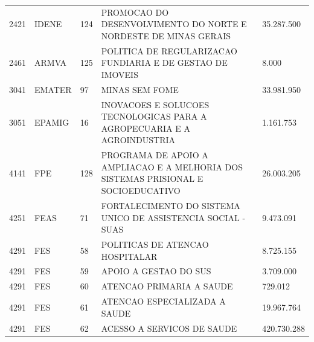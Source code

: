 \documentclass{article}
\begin{document}
\begin{longtable}[c]{m{1cm}|m{1.5cm}|m{1cm}m{10cm}|m{2cm}}
\multicolumn{1}{C{1cm}|}{2421} & \multicolumn{1}{L{1.5cm}|}{IDENE} & \multicolumn{1}{C{1cm}|}{124} & \multicolumn{1}{L{10cm}|}{PROMOCAO DO DESENVOLVIMENTO DO NORTE E NORDESTE DE MINAS GERAIS} & \multicolumn{1}{R{2cm}}{35.287.500} \\
\multicolumn{1}{C{1cm}|}{2461} & \multicolumn{1}{L{1.5cm}|}{ARMVA} & \multicolumn{1}{C{1cm}|}{125} & \multicolumn{1}{L{10cm}|}{POLITICA DE REGULARIZACAO FUNDIARIA E DE GESTAO DE IMOVEIS} & \multicolumn{1}{R{2cm}}{8.000} \\
\multicolumn{1}{C{1cm}|}{3041} & \multicolumn{1}{L{1.5cm}|}{EMATER} & \multicolumn{1}{C{1cm}|}{97} & \multicolumn{1}{L{10cm}|}{MINAS SEM FOME} & \multicolumn{1}{R{2cm}}{33.981.950} \\
\multicolumn{1}{C{1cm}|}{3051} & \multicolumn{1}{L{1.5cm}|}{EPAMIG} & \multicolumn{1}{C{1cm}|}{16} & \multicolumn{1}{L{10cm}|}{INOVACOES E SOLUCOES TECNOLOGICAS PARA A AGROPECUARIA E A AGROINDUSTRIA} & \multicolumn{1}{R{2cm}}{1.161.753} \\
\multicolumn{1}{C{1cm}|}{4141} & \multicolumn{1}{L{1.5cm}|}{FPE} & \multicolumn{1}{C{1cm}|}{128} & \multicolumn{1}{L{10cm}|}{PROGRAMA DE APOIO A AMPLIACAO E A MELHORIA DOS SISTEMAS PRISIONAL E SOCIOEDUCATIVO} & \multicolumn{1}{R{2cm}}{26.003.205} \\
\multicolumn{1}{C{1cm}|}{4251} & \multicolumn{1}{L{1.5cm}|}{FEAS} & \multicolumn{1}{C{1cm}|}{71} & \multicolumn{1}{L{10cm}|}{FORTALECIMENTO DO SISTEMA UNICO DE ASSISTENCIA SOCIAL - SUAS} & \multicolumn{1}{R{2cm}}{9.473.091} \\
\multicolumn{1}{C{1cm}|}{4291} & \multicolumn{1}{L{1.5cm}|}{FES} & \multicolumn{1}{C{1cm}|}{58} & \multicolumn{1}{L{10cm}|}{POLITICAS DE ATENCAO HOSPITALAR} & \multicolumn{1}{R{2cm}}{8.725.155} \\
\multicolumn{1}{C{1cm}|}{4291} & \multicolumn{1}{L{1.5cm}|}{FES} & \multicolumn{1}{C{1cm}|}{59} & \multicolumn{1}{L{10cm}|}{APOIO A GESTAO DO SUS} & \multicolumn{1}{R{2cm}}{3.709.000} \\
\multicolumn{1}{C{1cm}|}{4291} & \multicolumn{1}{L{1.5cm}|}{FES} & \multicolumn{1}{C{1cm}|}{60} & \multicolumn{1}{L{10cm}|}{ATENCAO PRIMARIA A SAUDE} & \multicolumn{1}{R{2cm}}{729.012} \\
\multicolumn{1}{C{1cm}|}{4291} & \multicolumn{1}{L{1.5cm}|}{FES} & \multicolumn{1}{C{1cm}|}{61} & \multicolumn{1}{L{10cm}|}{ATENCAO ESPECIALIZADA A SAUDE} & \multicolumn{1}{R{2cm}}{19.967.764} \\
\multicolumn{1}{C{1cm}|}{4291} & \multicolumn{1}{L{1.5cm}|}{FES} & \multicolumn{1}{C{1cm}|}{62} & \multicolumn{1}{L{10cm}|}{ACESSO A SERVICOS DE SAUDE} & \multicolumn{1}{R{2cm}}{420.730.288} \\

\end{longtable}
\end{document}
